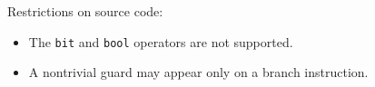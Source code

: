 Restrictions on source code:
\begin{itemize}
\item
The \texttt{bit} and \texttt{bool} operators are not supported.
\item
A nontrivial guard may appear only on a branch instruction.
\end{itemize}
